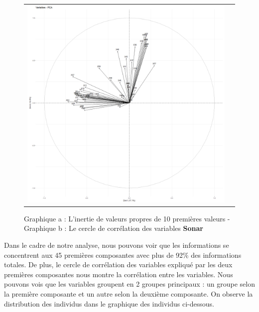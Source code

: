 \documentclass[a4paper,11pt,oneside,roman]{article}
\begin{document}
\begin{figure}[htb]
\begin{tabular}{c|c}
    \includegraphics[scale = .1]{discrimination/spambase2/varplot.png}
\end{tabular}
    \caption{Graphique a : L'inertie de valeurs propres de 10 premières valeurs - Graphique b : Le cercle de corrélation des variables \textbf{Sonar}}
    \label{fig:my_label}
\end{figure}
Dans le cadre de notre analyse, nous pouvons voir que les informations se concentrent aux 45 premières composantes avec plus de 92\% des informations totales. De plus, le cercle de corrélation des variables expliqué par les deux premières composantes nous montre la corrélation entre les variables. Nous pouvons vois que les variables groupent en 2 groupes principaux : un groupe selon la première composante et un autre selon la deuxième composante. On observe la distribution des individus dans le graphique des individus ci-dessous. 
\end{document}
